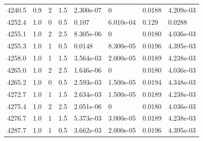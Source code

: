 \documentclass[preview]{standalone}
\begin{document}
{{{{{{{{{{{{{{{{\begin{tabular}{L{1.2cm}C{1.2cm} C{0.3cm}C{0.5cm} C{1.4cm}C{1.4cm} C{1.4cm}C{1.4cm}}
  4240.5  &   0.9  & 2     & 1.5 &  2.300e-07  & 0  & 0.0188 &  4.209e-03   \\ 
  4252.4  &   1.0  & 0     & 0.5 &  0.107  & 6.010e-04  & 0.129 &  0.0288   \\ 
  4255.1  &   1.0  & 2     & 2.5 &  8.305e-06  & 0  & 0.0180 &  4.036e-03   \\ 
  4255.3  &   1.0  & 1     & 0.5 &  0.0148  & 8.300e-05  & 0.0196 &  4.395e-03   \\ 
  4258.0  &   1.0  & 1     & 1.5 &  3.564e-03  & 2.000e-05  & 0.0189 &  4.238e-03   \\ 
  4265.0  &   1.0  & 2     & 2.5 &  1.646e-06  & 0  & 0.0180 &  4.036e-03   \\ 
  4265.2  &   1.0  & 0     & 0.5 &  2.593e-03  & 1.500e-05  & 0.0194 &  4.348e-03   \\ 
  4272.7  &   1.0  & 1     & 1.5 &  2.634e-03  & 1.500e-05  & 0.0189 &  4.238e-03   \\ 
  4275.4  &   1.0  & 2     & 2.5 &  2.051e-06  & 0  & 0.0180 &  4.036e-03   \\ 
  4276.7  &   1.0  & 1     & 1.5 &  5.373e-03  & 3.000e-05  & 0.0189 &  4.238e-03   \\ 
  4287.7  &   1.0  & 1     & 0.5 &  3.662e-03  & 2.000e-05  & 0.0196 &  4.395e-03   \\ 
\hline 
\end{tabular} 

}}}}}}}}}}}}}}}}
\end{document}

